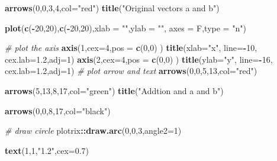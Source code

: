 \documentclass[
]{book}
\newenvironment{Shaded}{\begin{snugshade}}{\end{snugshade}}
\newcommand{\CommentTok}[1]{\textcolor[rgb]{0.56,0.35,0.01}{\textit{#1}}}
\newcommand{\DataTypeTok}[1]{\textcolor[rgb]{0.13,0.29,0.53}{#1}}
\newcommand{\DecValTok}[1]{\textcolor[rgb]{0.00,0.00,0.81}{#1}}
\newcommand{\FloatTok}[1]{\textcolor[rgb]{0.00,0.00,0.81}{#1}}
\newcommand{\KeywordTok}[1]{\textcolor[rgb]{0.13,0.29,0.53}{\textbf{#1}}}
\newcommand{\NormalTok}[1]{#1}
\newcommand{\OperatorTok}[1]{\textcolor[rgb]{0.81,0.36,0.00}{\textbf{#1}}}
\newcommand{\StringTok}[1]{\textcolor[rgb]{0.31,0.60,0.02}{#1}}
\theoremstyle{definition}
\theoremstyle{definition}
\theoremstyle{definition}
\theoremstyle{remark}
\begin{document}
\begin{Shaded}
\begin{Highlighting}[]
\KeywordTok{arrows}\NormalTok{(}\DecValTok{0}\NormalTok{,}\DecValTok{0}\NormalTok{,}\DecValTok{3}\NormalTok{,}\DecValTok{4}\NormalTok{,}\DataTypeTok{col=}\StringTok{"red"}\NormalTok{)}
\KeywordTok{title}\NormalTok{(}\StringTok{"Original vectors a and b"}\NormalTok{)}


\KeywordTok{plot}\NormalTok{(}\KeywordTok{c}\NormalTok{(}\OperatorTok{-}\DecValTok{20}\NormalTok{,}\DecValTok{20}\NormalTok{),}\KeywordTok{c}\NormalTok{(}\OperatorTok{-}\DecValTok{20}\NormalTok{,}\DecValTok{20}\NormalTok{),}\DataTypeTok{xlab =} \StringTok{""}\NormalTok{,}\DataTypeTok{ylab =} \StringTok{""}\NormalTok{,}
 \DataTypeTok{axes =}\NormalTok{ F,}\DataTypeTok{type =} \StringTok{"n"}\NormalTok{)}



\CommentTok{# plot the axis}
\KeywordTok{axis}\NormalTok{(}\DecValTok{1}\NormalTok{,}\DataTypeTok{cex=}\DecValTok{4}\NormalTok{,}\DataTypeTok{pos =} \KeywordTok{c}\NormalTok{(}\DecValTok{0}\NormalTok{,}\DecValTok{0}\NormalTok{) )}
\KeywordTok{title}\NormalTok{(}\DataTypeTok{xlab=}\StringTok{"x"}\NormalTok{, }\DataTypeTok{line=}\OperatorTok{-}\DecValTok{10}\NormalTok{, }\DataTypeTok{cex.lab=}\FloatTok{1.2}\NormalTok{,}\DataTypeTok{adj=}\DecValTok{1}\NormalTok{)}
\KeywordTok{axis}\NormalTok{(}\DecValTok{2}\NormalTok{,}\DataTypeTok{cex=}\DecValTok{4}\NormalTok{,}\DataTypeTok{pos =} \KeywordTok{c}\NormalTok{(}\DecValTok{0}\NormalTok{,}\DecValTok{0}\NormalTok{) )}
\KeywordTok{title}\NormalTok{(}\DataTypeTok{ylab=}\StringTok{"y"}\NormalTok{, }\DataTypeTok{line=}\OperatorTok{-}\DecValTok{16}\NormalTok{, }\DataTypeTok{cex.lab=}\FloatTok{1.2}\NormalTok{,}\DataTypeTok{adj=}\DecValTok{1}\NormalTok{)}
\CommentTok{# plot arrow and text}
\KeywordTok{arrows}\NormalTok{(}\DecValTok{0}\NormalTok{,}\DecValTok{0}\NormalTok{,}\DecValTok{5}\NormalTok{,}\DecValTok{13}\NormalTok{,}\DataTypeTok{col=}\StringTok{"red"}\NormalTok{)}

\KeywordTok{arrows}\NormalTok{(}\DecValTok{5}\NormalTok{,}\DecValTok{13}\NormalTok{,}\DecValTok{8}\NormalTok{,}\DecValTok{17}\NormalTok{,}\DataTypeTok{col=}\StringTok{"green"}\NormalTok{)}
\KeywordTok{title}\NormalTok{(}\StringTok{"Addtion and a and b"}\NormalTok{)}

\KeywordTok{arrows}\NormalTok{(}\DecValTok{0}\NormalTok{,}\DecValTok{0}\NormalTok{,}\DecValTok{8}\NormalTok{,}\DecValTok{17}\NormalTok{,}\DataTypeTok{col=}\StringTok{"black"}\NormalTok{)}


\CommentTok{# draw circle}
\NormalTok{plotrix}\OperatorTok{::}\KeywordTok{draw.arc}\NormalTok{(}\DecValTok{0}\NormalTok{,}\DecValTok{0}\NormalTok{,}\DecValTok{3}\NormalTok{,}\DataTypeTok{angle2=}\DecValTok{1}\NormalTok{)}

\KeywordTok{text}\NormalTok{(}\DecValTok{1}\NormalTok{,}\DecValTok{1}\NormalTok{,}\StringTok{"1.2"}\NormalTok{,}\DataTypeTok{cex=}\FloatTok{0.7}\NormalTok{)}
\end{Highlighting}
\end{Shaded}
\end{document}
